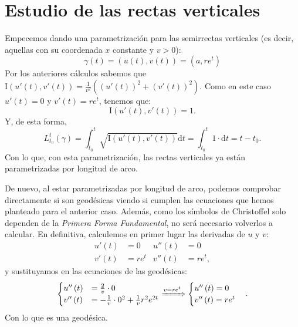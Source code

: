 \section{Estudio de las rectas verticales}
Empecemos dando una parametrización para las semirrectas verticales (es decir,
aquellas con su coordenada $x$ constante y $v > 0$):
\[
\gamma\left( t \right) = \left( u\left( t \right), v\left( t \right) \right) =
\left( a, re^t \right)
\]
Por los anteriores cálculos sabemos que $\mathrm{I}\left( u'\left( t \right), v'\left( t \right) \right) =
\frac{1}{v^2}\left( \left( u'\left( t \right) \right)^2 + \left( v'\left( t
\right) \right)^2 \right)$. Como en este caso $u'\left( t \right) = 0$ y
$v'\left( t \right) = r e^t$, tenemos que:
\[
\mathrm{I} \left( u'\left( t \right), v'\left( t
\right) \right) = 1.
\]
Y, de esta forma,
\[
L_{t_0}^t \left( \gamma \right) = \int_{t_0}^{t}
\sqrt{\mathrm{I} \left( u'\left( t \right), v'\left(
t \right) \right)} \mathrm{d}t = \int_{t_0}^{t} 1 \cdot \mathrm{d}t = t - t_0.
\]
Con lo que, con esta parametrización, las rectas verticales ya están
parametrizadas por longitud de arco.

De nuevo, al estar parametrizadas por longitud de arco, podemos comprobar
directamente si son geodésicas viendo si cumplen las ecuaciones que hemos
planteado para el anterior caso. Además, como los símbolos de Christoffel solo
dependen de la \textit{Primera Forma Fundamental}, no será necesario volverlos a
calcular. En definitiva, calculemos en primer lugar las derivadas de $u$ y $v$:
\begin{align*}
    u'\left( t \right) &= 0 & u''\left( t \right) &= 0\\
    v'\left( t \right) &= r e^t & v''\left( t \right) &= re^t,
\end{align*}
y sustituyamos en las ecuaciones de las geodésicas:
\[
\begin{cases}
    u''\left( t \right) &= \frac{2}{v} \cdot 0\\
    v''\left( t \right) &= - \frac{1}{v} \cdot 0^2 + \frac{1}{v} r^2 e^{2t} 
\end{cases} \xRightarrow{v = re^t} \begin{cases}
    u''\left( t \right) = 0\\
    v''\left( t \right) = re^t
\end{cases}.
\]
Con lo que es una geodésica.
